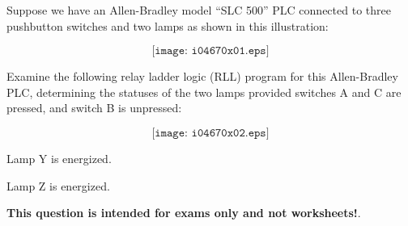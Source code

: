 

Suppose we have an Allen-Bradley model ``SLC 500'' PLC connected to three pushbutton switches and two lamps as shown in this illustration:

$$\texttt{[image: i04670x01.eps]}$$

Examine the following relay ladder logic (RLL) program for this Allen-Bradley PLC, determining the statuses of the two lamps provided switches A and C are pressed, and switch B is unpressed:

$$\texttt{[image: i04670x02.eps]}$$







Lamp Y is energized.

\vskip 10pt

Lamp Z is energized.







{\bf This question is intended for exams only and not worksheets!}.



